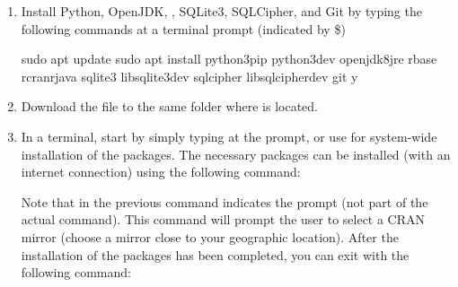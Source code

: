 \documentclass[letterpaper,12pt,english]{sphinxmanual}
\begin{document}
\begin{enumerate}
\item {} 
Install Python, OpenJDK, , SQLite3, SQLCipher, and Git by typing the following commands at a terminal prompt (indicated by \$)

%
\begin{sphinxVerbatim}[commandchars=\\\{\}]
\PYGZdl{} sudo apt update
\PYGZdl{} sudo apt install python3\PYGZhy{}pip python3\PYGZhy{}dev openjdk\PYGZhy{}8\PYGZhy{}jre r\PYGZhy{}base r\PYGZhy{}cran\PYGZhy{}rjava sqlite3 libsqlite3\PYGZhy{}dev sqlcipher libsqlcipher\PYGZhy{}dev git \PYGZhy{}y
\end{sphinxVerbatim}

\item {} 
Download the  file to the same folder where 
is located.

\item {} 
In a terminal, start  by simply typing  at the prompt, or use  for system-wide installation of
the packages.  The necessary packages can be installed (with an internet connection) using the following command:

%
\begin{sphinxVerbatim}[commandchars=\\\{\}]
   
\end{sphinxVerbatim}

Note that \sphinxcode{\sphinxupquote{\textgreater{}}} in the previous command indicates the  prompt (not part of the actual command).  This command will
prompt the user to select a CRAN mirror (choose a mirror close to your geographic location).  After the installation
of the packages has been completed, you can exit  with the following command:

%
\begin{sphinxVerbatim}[commandchars=\\\{\}]
 
\end{sphinxVerbatim}


\end{enumerate}
\end{document}
